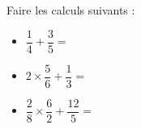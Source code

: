 \documentclass{automatisme}
\begin{document}
\begin{frame}
	Faire les calculs suivants : \bigskip
	\begin{itemize}
		\setlength{\itemsep}{1em}
		\item $\dfrac{1}{4} + \dfrac{3}{5} = $
		\item $2 × \dfrac{5}{6} + \dfrac{1}{3} = $
		\item $\dfrac{2}{8} × \dfrac{6}{2} + \dfrac{12}{5} = $
	\end{itemize}
\end{frame}
\end{document}
